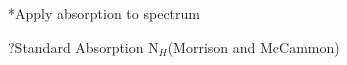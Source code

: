 % 
%
%
%
% 
%
%
%
% 
%
%
%
%
%
%
%
%
%
%
%
%
%
%
%
%

\**Apply absorption to spectrum

\??Standard Absorption N$_{H}$(Morrison and McCammon)

